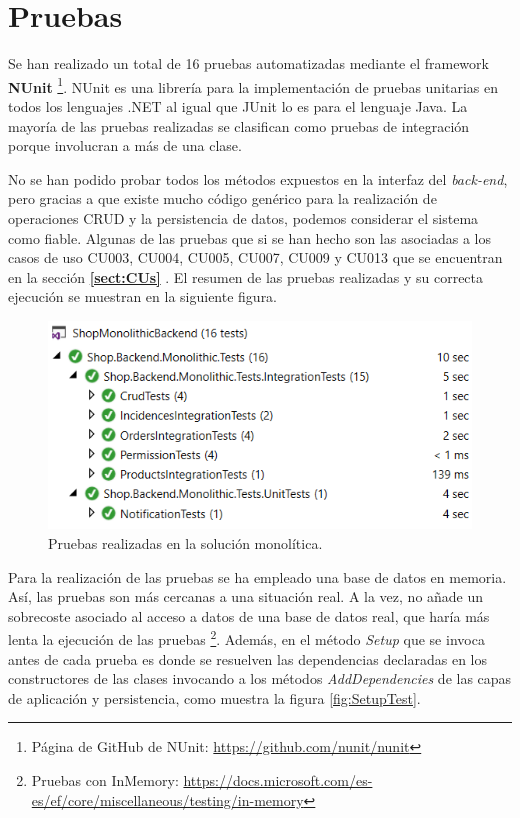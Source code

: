\documentclass[11pt,spanish,listoffigures]{tfgetsinf}
\begin{document}
\section{Pruebas} \label{sect:MonoPruebas}

Se han realizado un total de 16 pruebas automatizadas mediante el framework \textbf{NUnit} \footnote{ Página de GitHub de NUnit: \url{https://github.com/nunit/nunit}}. NUnit es una librería para la implementación de pruebas unitarias en todos los lenguajes .NET al igual que JUnit lo es para el lenguaje Java. La mayoría de las pruebas realizadas se clasifican como pruebas de integración porque involucran a más de una clase. 

No se han podido probar todos los métodos expuestos en la interfaz del \textit{back-end}, pero gracias a que existe mucho código genérico para la realización de operaciones CRUD y la persistencia de datos, podemos considerar el sistema como fiable. Algunas de las pruebas que si se han hecho son las asociadas a los casos de uso CU003, CU004, CU005, CU007, CU009 y CU013 que se encuentran en la sección \textbf{\ref{sect:CUs} }. El resumen de las pruebas realizadas y su correcta ejecución se muestran en la siguiente figura.

\begin{figure}[h]
\centering
\includegraphics[scale=0.8]{Tests}
\caption{Pruebas realizadas en la solución monolítica.}
\end{figure}

Para la realización de las pruebas se ha empleado una base de datos en memoria. Así, las pruebas son más cercanas a una situación real. A la vez, no añade un sobrecoste asociado al acceso a datos de una base de datos real, que haría más lenta la ejecución de las pruebas \footnote{ Pruebas con InMemory: \url{https://docs.microsoft.com/es-es/ef/core/miscellaneous/testing/in-memory}}. Además, en el método \textit{Setup} que se invoca antes de cada prueba es donde se resuelven las dependencias declaradas en los constructores de las clases invocando a los métodos \textit{AddDependencies} de las capas de aplicación y persistencia, como muestra la figura \ref{fig:SetupTest}. 
\end{document}
